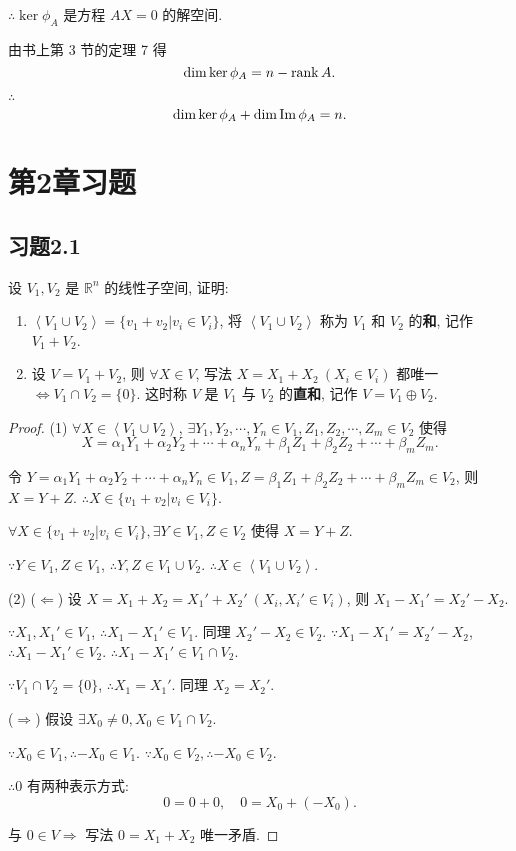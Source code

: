 \documentclass{ctexart}
\begin{document}
$\therefore\ker\phi_A$ 是方程 $AX=0$ 的解空间.

由书上第 3 节的定理 7 得
\[\dim\ker\phi_A=n-\operatorname{rank} A.\]

$\therefore$
\[\dim\ker\phi_A+\dim\operatorname{Im} \phi_A=n.\]
\section{第2章习题}
\subsection{习题2.1}
\begin{exercise}[有改动]\label{ex1.1}
    设 $V_1,V_2$ 是 $\mathbb{R}^n$ 的线性子空间, 证明:
    \begin{enumerate}
        \def\labelenumi{(\arabic{enumi})}
        \item $\left<V_1\cup V_2\right>=\{v_1+v_2|v_i\in V_i\}$, 将 $\left<V_1\cup V_2\right>$ 称为 $V_1$ 和 $V_2$ 的\textbf{和}, 记作 $V_1+V_2$.
        \item 设 $V=V_1+V_2$, 则 $\forall X\in V$, 写法 $X=X_1+X_2\ (X_i\in V_i)$ 都唯一 $\Leftrightarrow V_1\cap V_2=\{0\}$. 这时称 $V$ 是 $V_1$ 与 $V_2$ 的\textbf{直和}, 记作 $V=V_1\oplus V_2$.
    \end{enumerate}
\end{exercise}
\begin{proof}
    (1) $\forall X\in\left<V_1\cup V_2\right>$, $\exists Y_1,Y_2,\cdots,Y_n\in V_1,Z_1,Z_2,\cdots,Z_m\in V_2$ 使得
    \[X=\alpha_1Y_1+\alpha_2Y_2+\cdots+\alpha_nY_n+\beta_1Z_1+\beta_2Z_2+\cdots+\beta_mZ_m.\]

    令 $Y=\alpha_1Y_1+\alpha_2Y_2+\cdots+\alpha_nY_n\in V_1,Z=\beta_1Z_1+\beta_2Z_2+\cdots+\beta_mZ_m\in V_2$, 则 $X=Y+Z$. $\therefore X\in\{v_1+v_2|v_i\in V_i\}$.

    $\forall X\in\{v_1+v_2|v_i\in V_i\},\exists Y\in V_1,Z\in V_2$ 使得 $X=Y+Z$.

    $\because Y\in V_1,Z\in V_1$, $\therefore Y,Z\in V_1\cup V_2$. $\therefore X\in\left<V_1\cup V_2\right>$.
    
    (2) ($\Leftarrow$) 设 $X=X_1+X_2=X_1'+X_2'\ (X_i,X_i'\in V_i)$, 则 $X_1-X_1'=X_2'-X_2$.

    $\because X_1,X_1'\in V_1$, $\therefore X_1-X_1'\in V_1$. 同理 $X_2'-X_2\in V_2$. $\because X_1-X_1'=X_2'-X_2$, $\therefore X_1-X_1'\in V_2$. $\therefore X_1-X_1'\in V_1\cap V_2$.

    $\because V_1\cap V_2=\{0\}$, $\therefore X_1=X_1'$. 同理 $X_2=X_2'$.

    ($\Rightarrow$) 假设 $\exists X_0\neq0,X_0\in V_1\cap V_2$.

    $\because X_0\in V_1,\therefore-X_0\in V_1$. $\because X_0\in V_2,\therefore-X_0\in V_2$.

    $\therefore0$ 有两种表示方式:
    \[0=0+0,\quad0=X_0+(-X_0).\]

    与 $0\in V\Rightarrow$ 写法 $0=X_1+X_2$ 唯一矛盾.
\end{proof}
\end{document}
